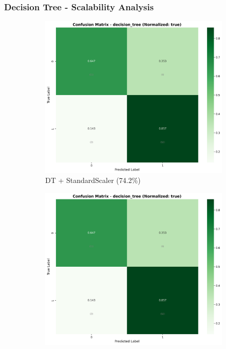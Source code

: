 \subsubsection{Decision Tree - Scalability Analysis}

\begin{figure}[H]
\centering
\begin{subfigure}[b]{0.315\textwidth}
\centering
\includegraphics[width=1\textwidth]{Result/cleveland_dataset/confusion_matrices/decision_tree_numeric_dataset_StandardScaler.png}
\caption{DT + StandardScaler (74.2\%)}
\label{fig:dt_standardscaler}
\end{subfigure}
\hfill
\begin{subfigure}[b]{0.315\textwidth}
\centering
\includegraphics[width=1\textwidth]{Result/cleveland_dataset/confusion_matrices/decision_tree_numeric_dataset_MinMaxScaler.png}

\end{subfigure}
\end{figure}
